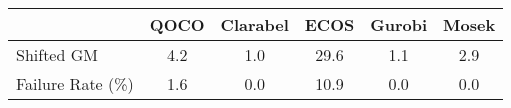 \begin{tabular}{lccccc}
  \hline
   & \textbf{QOCO} & \textbf{Clarabel} & \textbf{ECOS} & \textbf{Gurobi} & \textbf{Mosek} \\ \hline
  Shifted GM & 4.2 & 1.0 & 29.6 & 1.1 & 2.9 \\ 
  Failure Rate (\%) & 1.6 & 0.0 & 10.9 & 0.0 & 0.0 \\ \hline 
\end{tabular}
